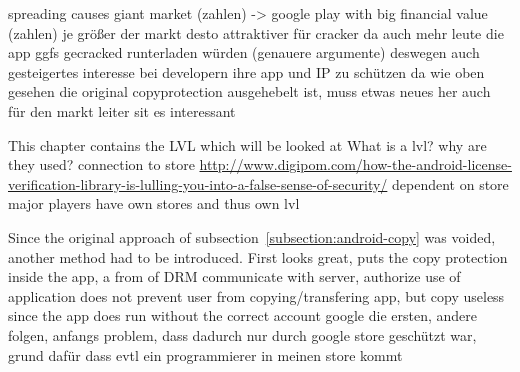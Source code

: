 spreading causes giant market (zahlen) -> google play with big financial value (zahlen)\newline
je größer der markt desto attraktiver für cracker da auch mehr leute die app ggfs gecracked runterladen würden (genauere argumente)\newline
deswegen auch gesteigertes interesse bei developern ihre app und IP zu schützen\newline
da wie oben gesehen die original copyprotection ausgehebelt ist, muss etwas neues her\newline
auch für den markt leiter sit es interessant


This chapter contains the LVL which will be looked at\newline
What is a lvl? why are they used? connection to store\newline
\url{http://www.digipom.com/how-the-android-license-verification-library-is-lulling-you-into-a-false-sense-of-security/}\newline
dependent on store\newline
major players have own stores and thus own lvl\newline


Since the original approach of subsection~\ref{subsection:android-copy} was voided, another method had to be introduced.
First looks great, puts the copy protection inside the app, a from of DRM\newline
communicate with server, authorize use of application\newline
does not prevent user from copying/transfering app, but copy useless since the app does run without the correct account\newline
google die ersten, andere folgen, anfangs problem, dass dadurch nur durch google store geschützt war, grund dafür dass evtl ein programmierer in meinen store kommt\newline
